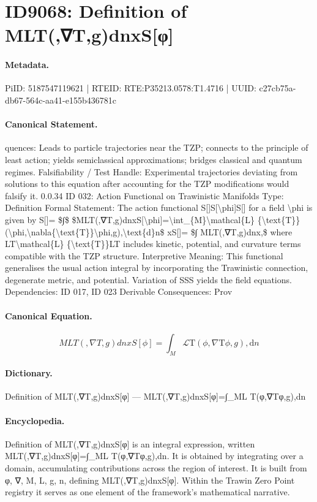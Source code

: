 \section*{ID9068: Definition of MLT(,∇T,g)dnxS[φ]}
\paragraph{Metadata.}
PiID: 5187547119621 | RTEID: RTE:P35213.0578:T1.4716 | UUID: c27cb75a-db67-564c-aa41-e155b436781c

\paragraph{Canonical Statement.}
quences: Leads to particle trajectories near the TZP; connects to the principle of least action; yields semiclassical approximations; bridges classical and quantum regimes. Falsifiability / Test Handle: Experimental trajectories deviating from solutions to this equation after accounting for the TZP modifications would falsify it. 0.0.34 ID 032: Action Functional on Trawinistic Manifolds Type: Definition Formal Statement: The action functional S[]S[\textbackslash{}phi]S[] for a field \textbackslash{}phi is given by S[]= \$∫\$ \$MLT(,∇T,g)dnxS[\textbackslash{}phi]=\textbackslash{}int\_\{M\}\textbackslash{}mathcal\{L\} \{\textbackslash{}text\{T\}\}(\textbackslash{}phi,\textbackslash{}nabla\{\textbackslash{}text\{T\}\}\textbackslash{}phi,g),\textbackslash{}text\{d\}n\$ xS[]= \$∫ MLT(,∇T,g)dnx,\$ where LT\textbackslash{}mathcal\{L\} \{\textbackslash{}text\{T\}\}LT includes kinetic, potential, and curvature terms compatible with the TZP structure. Interpretive Meaning: This functional generalises the usual action integral by incorporating the Trawinistic connection, degenerate metric, and potential. Variation of SSS yields the field equations. Dependencies: ID 017, ID 023 Derivable Consequences: Prov

\paragraph{Canonical Equation.}
\[
MLT(,∇T,g)dnxS[\phi]=\int_{M}\mathcal{L} {\text{T}}(\phi,\nabla{\text{T}}\phi,g),\text{d}n
\]

\paragraph{Dictionary.}
Definition of MLT(,∇T,g)dnxS[φ] — MLT(,∇T,g)dnxS[φ]=∫\_ML T(φ,∇Tφ,g),dn

\paragraph{Encyclopedia.}
Definition of MLT(,∇T,g)dnxS[φ] is an integral expression, written MLT(,∇T,g)dnxS[φ]=∫\_ML T(φ,∇Tφ,g),dn. It is obtained by integrating over a domain, accumulating contributions across the region of interest. It is built from φ, ∇, M, L, g, n, defining MLT(,∇T,g)dnxS[φ]. Within the Trawin Zero Point registry it serves as one element of the framework's mathematical narrative.
